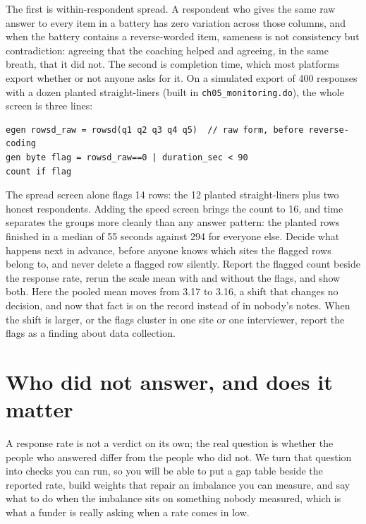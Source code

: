 The first is within-respondent spread. A respondent who gives the same raw answer to every item in a battery has zero variation across those columns, and when the battery contains a reverse-worded item, sameness is not consistency but contradiction: agreeing that the coaching helped and agreeing, in the same breath, that it did not. The second is completion time, which most platforms export whether or not anyone asks for it. On a simulated export of 400 responses with a dozen planted straight-liners (built in \texttt{ch05\_monitoring.do}), the whole screen is three lines:
\par
{\footnotesize
\begin{verbatim}
egen rowsd_raw = rowsd(q1 q2 q3 q4 q5)  // raw form, before reverse-coding
gen byte flag = rowsd_raw==0 | duration_sec < 90
count if flag
\end{verbatim}
}
The spread screen alone flags 14 rows: the 12 planted straight-liners plus two honest respondents. Adding the speed screen brings the count to 16, and time separates the groups more cleanly than any answer pattern: the planted rows finished in a median of 55 seconds against 294 for everyone else. Decide what happens next in advance, before anyone knows which sites the flagged rows belong to, and never delete a flagged row silently. Report the flagged count beside the response rate, rerun the scale mean with and without the flags, and show both. Here the pooled mean moves from 3.17 to 3.16, a shift that changes no decision, and now that fact is on the record instead of in nobody's notes. When the shift is larger, or the flags cluster in one site or one interviewer, report the flags as a finding about data collection.

\section{Who did not answer, and does it matter}
A response rate is not a verdict on its own; the real question is whether the people who answered differ from the people who did not. We turn that question into checks you can run, so you will be able to put a gap table beside the reported rate, build weights that repair an imbalance you can measure, and say what to do when the imbalance sits on something nobody measured, which is what a funder is really asking when a rate comes in low.

